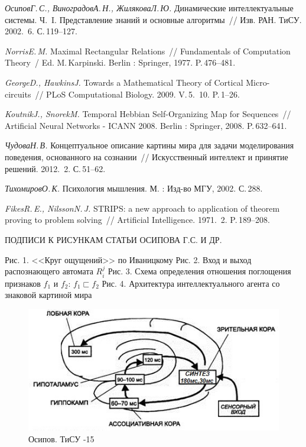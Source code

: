 \documentclass[a4paper, 12pt]{article}
\numberwithin{equation}{section}
\begin{document}
\begin{thebibliography}{99}
		\textit{Осипов\;Г.\,С., Виноградов\;А.\,Н., Жилякова\;Л.\,Ю.}
		Динамические интеллектуальные системы. Ч.~I. Представление знаний и основные алгоритмы~//
		Изв. РАН. ТиСУ. 2002. \No\,6. С.\,119--127.
		
		\textit{Norris\;E.\,M.}
		Maximal Rectangular Relations~// Fundamentals of Computation Theory~/ Ed. M.\,Karpinski.
		Berlin : Springer, 1977. P.\,476--481.
		
		\textit{George\;D., Hawkins\;J.}
		Towards a Mathematical Theory of Cortical Micro-circuits~//
		PLoS Computational Biology. 2009. V.\,5. \No\,10. P.\,1--26.
		
		\textit{Koutnik\;J., Snorek\;M.}
		Temporal Hebbian Self-Organizing Map for Sequences~//
		Artificial Neural Networks - ICANN 2008.
		Berlin : Springer, 2008. P.\,632--641.
		
		\textit{Чудова\;Н.\,В.}
		Концептуальное описание картины мира для задачи моделирования поведения, основанного на сознании~//
		Искусственный интеллект и принятие решений. 2012. \No\,2. С.\,51--62.
		
		\textit{Тихомиров\;О.\,К.}
		Психология мышления.
		М. : Изд-во МГУ, 2002. С.\,288.
		
		\textit{Fikes\;R.\,E., Nilsson\;N.\,J.}
		STRIPS: a new approach to application of theorem proving to problem solving~//
		Artificial Intelligence. 1971. \No\,2. P.\,189--208.
	\end{thebibliography}

	\newpage
	{\normalfont\centering\MakeUppercase{Подписи к рисункам статьи Осипова Г.С. и др.}\\}
	
	\noindent Рис. 1. <<Круг ощущений>> по Иваницкому \cite{Aleksandrov2007}\newline
	Рис. 2. Вход и выход распознающего автомата $R_i^j$\newline
	Рис. 3. Схема определения отношения поглощения признаков $f_1$ и $f_2$: $f_1\sqsubset f_2$\newline
	Рис. 4. Архитектура интеллектуального агента со знаковой картиной мира\newline
	
	\begin{figure}[p]
		\centering
		\includegraphics[width=0.7\linewidth]{ivan_cyrc.jpg}
		\caption{Осипов. ТиСУ -15}
		\label{fig:ivan_cyrcle}
	\end{figure}
\end{document}

